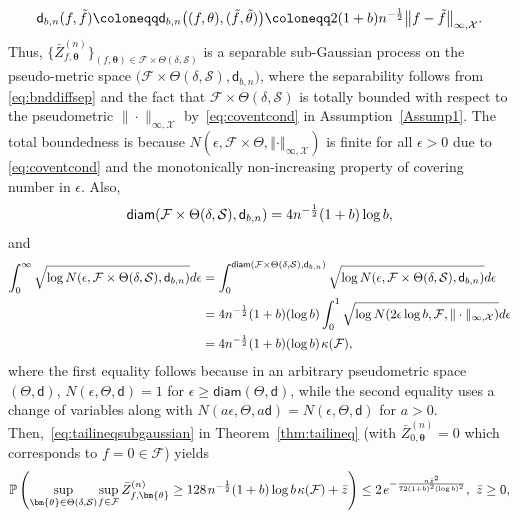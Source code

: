 \documentclass[a4paper,onecolumn,11pt,accepted=2026-05-12]{quantumarticle}
\newcommand{\norm}[1]{\left\Vert#1\right\Vert}
\newcommand{\cF}{\mathcal{F}}
\newcommand{\cS}{\mathcal{S}}
\newcommand{\cX}{\mathcal{X}}
\begin{document}
\begin{align}
\mathsf{d}_{b,n}(f,\tilde f)\coloneqq \mathsf{d}_{b,n}\big((f,\theta),(\tilde f,\tilde \theta)\big) \coloneqq 2(1+b)n^{-\frac 12}\big\|f-\tilde f\big\|_{\infty,\cX}. \notag
\end{align}
  Thus, $\{\bar Z^{(n)}_{f,\bm{\theta}}\}_{(f,\bm{\theta})\in \cF \times \Theta(\delta,\cS)}$ is a separable sub-Gaussian process on the pseudo-metric space $\big(\cF \times \Theta(\delta,\cS),\mathsf{d}_{b,n}\big)$, where the separability  follows from \eqref{eq:bnddiffsep} and the fact that $\cF \times \Theta(\delta,\cS)$ is totally bounded  with respect to the pseudometric $\big\|\cdot\big\|_{\infty,\cX}$ by~\eqref{eq:coventcond}  in Assumption~\ref{Assump1}. The total boundedness is because $N (\epsilon,\cF \times \Theta, \norm{\cdot}_{\infty,\cX}) $ is finite for all $\epsilon>0$ due to \eqref{eq:coventcond} and the monotonically non-increasing property of covering number in $\epsilon$. Also, 
  \begin{align}
   \mathsf{diam}(\cF \times \Theta(\delta,\cS),\mathsf{d}_{b,n}) =4n^{-\frac 12}(1+b)\log b , \notag  
  \end{align}
  and 
  \begin{align}
  \int_{0}^{\infty} \sqrt{\log N(\epsilon,\cF \times \Theta(\delta,\cS),\mathsf{d}_{b,n})}d\epsilon  &= \int_{0}^{\mathsf{diam}(\cF \times \Theta(\delta,\cS),\mathsf{d}_{b,n})} \sqrt{\log N(\epsilon,\cF \times \Theta(\delta,\cS),\mathsf{d}_{b,n})}d\epsilon  \notag \\
      &=4n^{-\frac 12}(1+b) (\log b) \int_{0}^{1} \sqrt{\log N(2\epsilon \log b,\cF, \| \cdot \|_{\infty,\cX})}d\epsilon \notag \\
      &= 4 n^{-\frac 12}(1+b) (\log b) \mspace{2 mu} \kappa(\cF), \notag
  \end{align}
where the first equality follows because in an arbitrary pseudometric space $(\Theta,\mathsf{d})$, $N(\epsilon, \Theta,\mathsf{d})=1$ for $\epsilon \geq \mathsf{diam}(\Theta,\mathsf{d})$, while the second equality uses a change of variables along with  $N(a\epsilon, \Theta,a\mathsf{d})=N(\epsilon,\Theta,\mathsf{d})$ for $a>0$. 
Then,~\eqref{eq:tailineqsubgaussian} in Theorem~\ref{thm:tailineq} (with $\bar Z^{(n)}_{0,\bm{\theta}}=0$ which corresponds to $f=0 \in \cF$)   yields 
  \begin{align}
\mathbb{P}\left(\sup_{\bm{\theta} \in \Theta(\delta,\cS)}\mspace{-2 mu}\sup_{f  \in \cF} \bar Z^{(n)}_{f,\bm{\theta}}\geq 128 \mspace{2 mu}n^{-\frac 12}(1+b) \log b \mspace{2 mu} \kappa(\cF)+ \bar z \right) \leq 2\mspace{2 mu}e^{-\frac{n \bar  z^2}{72(1+b)^2(\log b)^2}}, ~\bar z \geq 0,\notag
  \end{align}
\end{document}
